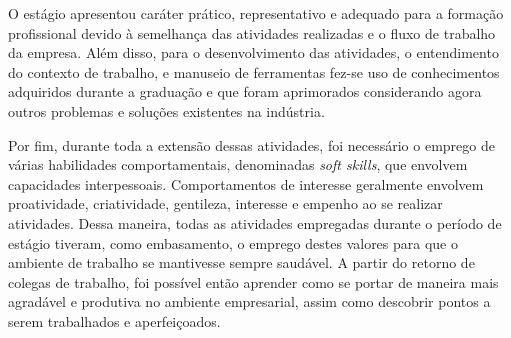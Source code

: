 \documentclass[
	12pt,				%
    oneside,			%
	a4paper,			%
	english,			%
	french,				%
	spanish,			%
	brazil				%
	]{abntex2}
\begin{document}
O estágio apresentou caráter prático, representativo e adequado para a formação profissional devido à semelhança das atividades realizadas e o fluxo de trabalho da empresa. Além disso, para o desenvolvimento das atividades, o entendimento do contexto de trabalho, e manuseio de ferramentas fez-se uso de conhecimentos adquiridos durante a graduação e que foram aprimorados considerando agora outros problemas e soluções existentes na indústria.   

Por fim, durante toda a extensão dessas atividades, foi necessário o emprego de várias habilidades comportamentais, denominadas \textit{soft skills}, que envolvem capacidades interpessoais. Comportamentos de interesse geralmente envolvem proatividade, criatividade, gentileza, interesse e empenho ao se realizar atividades. Dessa maneira, todas as atividades empregadas durante o período de estágio tiveram, como embasamento, o emprego destes valores para que o ambiente de trabalho se mantivesse sempre saudável. A partir do retorno de colegas de trabalho, foi possível então aprender como se portar de maneira mais agradável e produtiva no ambiente empresarial, assim como descobrir pontos a serem trabalhados e aperfeiçoados.

\postextual

%
\end{document}
